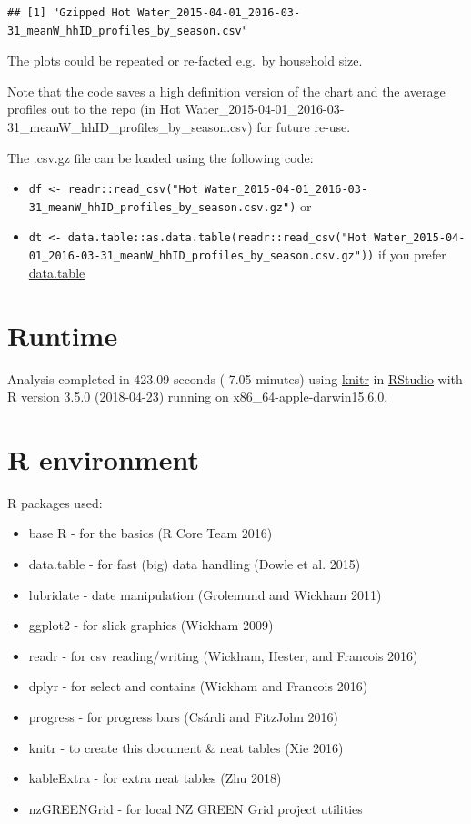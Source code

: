\documentclass[]{article}
\providecommand{\tightlist}{%
  \setlength{\itemsep}{0pt}\setlength{\parskip}{0pt}}
\begin{document}
\begin{verbatim}
## [1] "Gzipped Hot Water_2015-04-01_2016-03-31_meanW_hhID_profiles_by_season.csv"
\end{verbatim}

The plots could be repeated or re-facted e.g.~by household size.

Note that the code saves a high definition version of the chart and the
average profiles out to the repo (in Hot
Water\_2015-04-01\_2016-03-31\_meanW\_hhID\_profiles\_by\_season.csv)
for future re-use.

The .csv.gz file can be loaded using the following code:

\begin{itemize}
\tightlist
\item
  \texttt{df\ \textless{}-\ readr::read\_csv("Hot\ Water\_2015-04-01\_2016-03-31\_meanW\_hhID\_profiles\_by\_season.csv.gz")}
  or
\item
  \texttt{dt\ \textless{}-\ data.table::as.data.table(readr::read\_csv("Hot\ Water\_2015-04-01\_2016-03-31\_meanW\_hhID\_profiles\_by\_season.csv.gz"))}
  if you prefer \href{}{data.table}
\end{itemize}

\section{Runtime}\label{runtime}

Analysis completed in 423.09 seconds ( 7.05 minutes) using
\href{https://cran.r-project.org/package=knitr}{knitr} in
\href{http://www.rstudio.com}{RStudio} with R version 3.5.0 (2018-04-23)
running on x86\_64-apple-darwin15.6.0.

\section{R environment}\label{r-environment}

R packages used:

\begin{itemize}
\tightlist
\item
  base R - for the basics (R Core Team 2016)
\item
  data.table - for fast (big) data handling (Dowle et al. 2015)
\item
  lubridate - date manipulation (Grolemund and Wickham 2011)
\item
  ggplot2 - for slick graphics (Wickham 2009)
\item
  readr - for csv reading/writing (Wickham, Hester, and Francois 2016)
\item
  dplyr - for select and contains (Wickham and Francois 2016)
\item
  progress - for progress bars (Csárdi and FitzJohn 2016)
\item
  knitr - to create this document \& neat tables (Xie 2016)
\item
  kableExtra - for extra neat tables (Zhu 2018)
\item
  nzGREENGrid - for local NZ GREEN Grid project utilities
\end{itemize}
\end{document}
